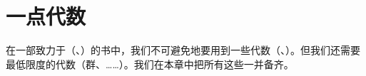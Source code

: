 
\chapter{一点代数\trTopology}
\label{ch:appendix-algebraic-topology}

在一部致力于（\trMorse、\trFloer）\trHomology{}的书中，我们不可避免地要用到一些代数\trHomology（\trKunnethFormula、\trLongExactSequence）。但我们还需要最低限度的代数\trTopology（\trHomotopy{}群、\trFirstChernClass{}……）。我们在本章中把所有这些一并备齐。



